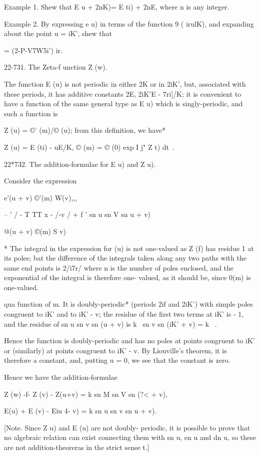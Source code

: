 Example 1. Shew that E u + 2nK)= E ti) + 2nE, where n is any integer.

Example 2. By expressing e u) in terms of the function 9 ( irulK), and
expanding about the point u = iK', shew that

 = (2-P-V7W5i') ir.

22-731. The Zeta-f unction Z (w).

The function E (u) is not periodic in either 2K or in 2iK', but,
associated with these periods, it has additive constants 2E, 2iK'E -
7ri]/K; it is convenient to have a function of the same general type
as E u) which is singly-periodic, and such a function is

Z (u) = ©' (m)/© (u); from this definition, we have*

Z (u) = E (ti) - uE/K, © (m) = © (0) exp I j" Z t) dt\ .

22*732. The addition-formulae for E u) and Z u).

Consider the expression

e'(u + v) ©'(m) W(v),,,

-- ' / - T TT x - /-v / + f ' sn u sn V sn u + v)

@(u + v) ©(m) S v)

* The integral in the expression for (u) is not one-valued as Z (f)
has residue 1 at its poles; bat the difference of the integrals taken
along any two paths with the same end points is 2/i7r/ where n is the
number of poles enclosed, and the exponential of the integral is
therefore one- valued, as it should be, since 0(m) is one-valued.

%
%

qua function of m. It is doubly-periodic* (periods 2if and 2iK') with
simple poles congruent to iK' and to iK' - v; the residue of the
first two terms at iK' is - 1, and the residue of sn u sn v sn (u + v)
is k~ sn v sn (iK' + v) = k~ .

Hence the function is doubly-periodic and has no poles at points
congruent to iK' or (similarly) at points congruent to iK' - v. By
Liouville's theorem, it is therefore a constant, and, putting u = 0,
we see that the constant is zero.

Hence we have the addition-formulae

Z (w) -f- Z (v) - Z(u+v) = k sn M sn V sn (?< + v),

E(u) + E (v) - Eiu 4- v) = k sn u sn v sn u + v).

[Note. Since Z u) and E (u) are not doubly- periodic, it is possible
to prove that no algebraic relation can exist connecting them with sn
u, en u and dn u, so these are not addition-theoreras in the strict
sense t.]

